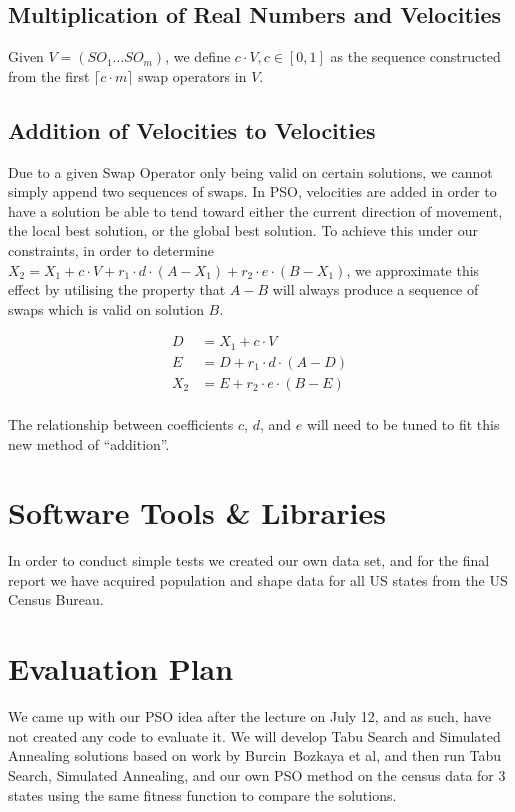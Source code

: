 \documentclass[journal]{IEEEtran}
\begin{document}
\subsection{Multiplication of Real Numbers and Velocities}
Given $V = (SO_1 \dots SO_m)$, we define $c \cdot V, c \in [0, 1]$ as the
sequence constructed from the first $\lceil c \cdot m \rceil$ swap operators in $V$.

\subsection{Addition of Velocities to Velocities}
Due to a given Swap Operator only being valid on certain solutions, we cannot
simply append two sequences of swaps.  In PSO, velocities are added in order to
have a solution be able to tend toward either the current direction of movement,
the local best solution, or the global best solution.  To achieve this under our
constraints, in order to determine $X_2 = X_1 + c\cdot V + r_1 \cdot d \cdot (A
- X_1) + r_2 \cdot e \cdot (B - X_1)$, we approximate this effect by utilising
the property that $A - B$ will always produce a sequence of swaps which is valid
on solution $B$.

\begin{equation}
\label{vel_encoding}
    \begin{aligned}
        D &= X_1 + c \cdot V\\
        E &= D + r_1 \cdot d \cdot (A - D)\\
        X_2 &= E + r_2 \cdot e \cdot (B - E)\\
    \end{aligned}
\end{equation}

The relationship between coefficients $c$, $d$, and $e$ will need to be tuned to fit this new method of
``addition''.

\section{Software Tools \& Libraries}
In order to conduct simple tests we created our own data set, and for the final
report we have acquired population and shape data for all US states from the
US Census Bureau.

\section{Evaluation Plan}
We came up with our PSO idea after the lecture on July 12, and as such, have not
created any code to evaluate it.  We will develop Tabu Search and Simulated
Annealing solutions based on work by Burcin~Bozkaya et al\cite{local-search},
and then run Tabu Search, Simulated Annealing, and our own PSO method on the
census data for 3 states using the same fitness function to compare the solutions.
\end{document}
